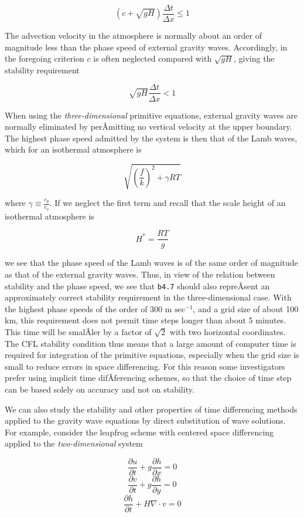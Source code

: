 {\[( c + \sqrt{gH})\frac{\Delta t}{\Delta x} \leq 1\]}

The advection velocity in the atmosphere is normally about an order of
magnitude less than the phase speed of external gravity waves.
Accordingly, in the foregoing criterion \(c\) is often neglected
compared with \(\sqrt{gH}\), giving the stability requirement

{\[\sqrt{gH}\frac{\Delta t}{\Delta x} < 1\]}

When using the \emph{three-dimensional} primitive equations, external
gravity waves are normally eliminated by perÂ­mitting no vertical
velocity at the upper boundary. The highest phase speed admitted by the
system is then that of the Lamb waves, which for an isothermal
atmosphere is

\[\sqrt{\left( \frac{f}{k} \right)^{2} + \gamma RT}\]

where \(\gamma \equiv \frac{c_{p}}{c_{v}}\). If we neglect the first
term and recall that the scale height of an isothermal atmosphere is

\[H^{*} = \frac{RT}{g}\]

we see that the phase speed of the Lamb waves is of the same order of
magnitude as that of the external gravity waves. Thus, in view of the
relation between stability and the phase speed, we see that
\texttt{b4.7} should also repreÂ­sent an approximately correct stability
requirement in the three-dimensional case. With the highest phase speeds
of the order of 300 m \(\text{sec}^{-1}\), and a grid size of about 100
km, this requirement does not permit time steps longer than about 5
minutes. This time will be smalÂ­ler by a factor of \(\sqrt{2}\) with two
horizontal coordinates. The CFL stability condition thus means that a
large amount of computer time is required for integration of the
primitive equations, especially when the grid size is small to reduce
errors in space differencing. For this reason some investigators prefer
using implicit time difÂ­ferencing schemes, so that the choice of time
step can be based solely on accuracy and not on stability.

We can also study the stability and other properties of time
differencing methods applied to the gravity wave equations by direct
substitution of wave solutions. For example, consider the leapfrog
scheme with centered space differencing applied to the
\emph{two-dimensional} system

{\[\frac{\partial u}{\partial t} + g\frac{\partial h}{\partial x} = 0\]\[\frac{\partial v}{\partial t} + g\frac{\partial h}{\partial y} = 0\]\[\frac{\partial h}{\partial t} + H\nabla\cdot v = 0\]}

